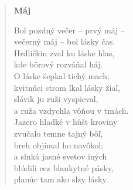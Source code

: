 \begin{verse}

% 
% 
% 
% 
% 

\bigskip

\textbf{Máj}

\smallskip

Bol pozdný večer -- prvý máj -- \\
večerný máj -- bol lásky čas. \\
Hrdličkin zval ku láske hlas, \\
kde bôrový rozváňal háj. \\
O láske šepkal tichý mach; \\
kvitnúci strom lkal lásky žiaľ, \\
slávik ju ruži vyspieval, \\
a ruža vzdychla vôňou v tmách. \\
Jazero hladké v húšt kroviny \\
zvučalo temne tajný bôľ, \\
breh objímal ho navôkol; \\
a slnká jasné svetov iných \\
blúdili cez blankytné pásky, \\
planúc tam ako slzy lásky.

\smallskip


\end{verse}